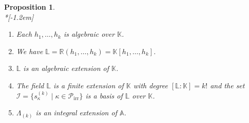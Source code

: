 \documentclass[10pt,a4paper]{amsart}
\newtheorem{prop}[theorem]{Proposition}
\theoremstyle{definition}
\DeclareMathOperator{\irr}{irr}
\begin{document}
\begin{prop}\label{PropLK}\ \\*[-1.2em]

\begin{enumerate}
\item\label{prop4.2_1} Each $h_{1},\ldots,h_{k}$ is algebraic over $\mathbb{K}$.

\item\label{prop4.2_2} We have $\mathbb{L}=\mathbb{R}(h_{1},\ldots,h_{k})=\mathbb{K}%
[h_{1},\ldots,h_{k}]$.

\item\label{prop4.2_3} $\mathbb{L}$ is an algebraic extension of $\mathbb{K}$.

\item\label{prop4.2_4} The field $\mathbb{L}$ is a finite extension of $\mathbb{K}$ with degree
$[\mathbb{L}:\mathbb{K}]=k!$ and the set $\mathcal{I}=\{s_{\kappa}^{(k)}%
\mid\kappa\in\mathcal{P}_{\irr }\}$ is a basis of $\mathbb{L}$ over
$\mathbb{K}$.

\item\label{prop4.2_5} $\Lambda_{(k)}$ is an integral extension of $\mathbb{A}$.
\end{enumerate}
\end{prop}
\end{document}
